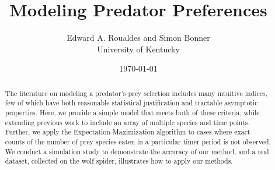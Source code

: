 \documentclass[12pt]{article}
\begin{document}
\title{Modeling Predator Preferences}
\author{Edward A. Roualdes and Simon Bonner \\ University of Kentucky}
\date{\today}
\maketitle

\begin{abstract}
The literature on modeling a predator's prey selection includes many intuitive indices, few of which have both reasonable statistical justification and tractable asymptotic properties.  Here, we provide a simple model that meets both of these criteria, while extending previous work to include an array of multiple species and time points.  Further, we apply the Expectation-Maximization algorithm to cases where exact counts of the number of prey species eaten in a particular timer period is not observed.  We conduct a simulation study to demonstrate the accuracy of our method, and a real dataset, collected on the wolf spider, illustrates how to apply our methods.
\end{abstract}









\end{document}
